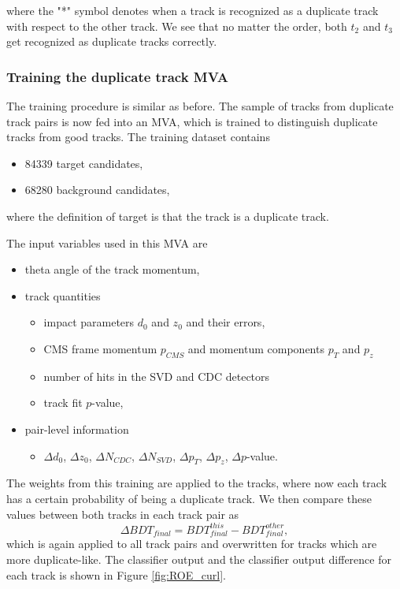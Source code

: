 where the "*" symbol denotes when a track is recognized as a duplicate track with respect to the other track. We see that no matter the order, both $t_2$ and $t_3$ get recognized as duplicate tracks correctly.

\subsubsection{Training the duplicate track MVA}
The training procedure is similar as before. The sample of tracks from duplicate track pairs is now fed into an MVA, which is trained to distinguish duplicate tracks from good tracks. The training dataset contains
\begin{itemize}
\item 84339 target candidates,
\item 68280 background candidates,
\end{itemize}
where the definition of target is that the track is a duplicate track. 

The input variables used in this MVA are
\begin{itemize}
\item theta angle of the track momentum,
\item track quantities
	\begin{itemize}
	\item impact parameters $d_0$ and $z_0$ and their errors,
	\item CMS frame momentum $p_{CMS}$ and momentum components $p_T$ and $p_z$ 
	\item number of hits in the SVD and CDC detectors
	\item track fit $p$-value,
	\end{itemize}
\item pair-level information
	\begin{itemize}
	\item $\Delta d_0$, $\Delta z_0$, $\Delta N_{CDC}$, $\Delta N_{SVD}$, $\Delta p_T$, $\Delta p_z$, $\Delta p$-value.  
	\end{itemize}
\end{itemize}

The weights from this training are applied to the tracks, where now each track has a certain probability of being a duplicate track. We then compare these values between both tracks in each track pair as
\begin{equation}
\Delta BDT_{final} = BDT_{final}^{this} - BDT_{final}^{other},
\end{equation}
which is again applied to all track pairs and overwritten for tracks which are more duplicate-like. The classifier output and the classifier output difference for each track is shown in Figure \ref{fig:ROE_curl}. 


